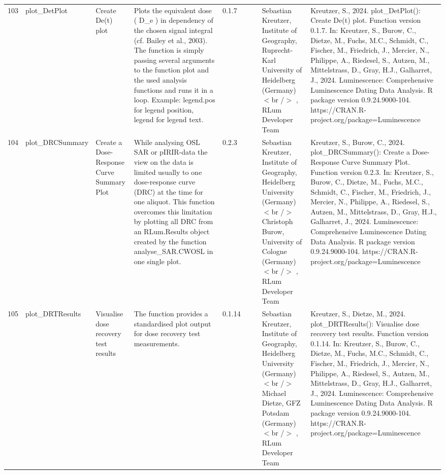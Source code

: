 \begin{table}[ht]
\begin{tabular}{rllllllll}
 \\ 
  103 & plot\_DetPlot & Create De(t) plot & Plots the equivalent dose ( D\_e ) in dependency of the chosen signal integral (cf. Bailey et al., 2003). The function is simply passing several arguments to the function  plot  and the used analysis functions and runs it in a loop. Example:  legend.pos  for legend position,  legend  for legend text. & 0.1.7
 &  &  & Sebastian Kreutzer, Institute of Geography, Ruprecht-Karl University of Heidelberg (Germany)$<$br /$>$ , RLum Developer Team & Kreutzer, S., 2024. plot\_DetPlot(): Create De(t) plot. Function version 0.1.7. In: Kreutzer, S., Burow, C., Dietze, M., Fuchs, M.C., Schmidt, C., Fischer, M., Friedrich, J., Mercier, N., Philippe, A., Riedesel, S., Autzen, M., Mittelstrass, D., Gray, H.J., Galharret, J., 2024. Luminescence: Comprehensive Luminescence Dating Data Analysis. R package version 0.9.24.9000-104. https://CRAN.R-project.org/package=Luminescence
 \\ 
  104 & plot\_DRCSummary & Create a Dose-Response Curve Summary Plot & While analysing OSL SAR or pIRIR-data the view on the data is limited usually to one dose-response curve (DRC) at the time for one aliquot. This function overcomes this limitation by plotting all DRC from an  RLum.Results  object created by the function  analyse\_SAR.CWOSL  in one single plot. & 0.2.3
 &  &  & Sebastian Kreutzer, Institute of Geography, Heidelberg University (Germany)  $<$br /$>$ Christoph Burow, University of Cologne (Germany)$<$br /$>$ , RLum Developer Team & Kreutzer, S., Burow, C., 2024. plot\_DRCSummary(): Create a Dose-Response Curve Summary Plot. Function version 0.2.3. In: Kreutzer, S., Burow, C., Dietze, M., Fuchs, M.C., Schmidt, C., Fischer, M., Friedrich, J., Mercier, N., Philippe, A., Riedesel, S., Autzen, M., Mittelstrass, D., Gray, H.J., Galharret, J., 2024. Luminescence: Comprehensive Luminescence Dating Data Analysis. R package version 0.9.24.9000-104. https://CRAN.R-project.org/package=Luminescence
 \\ 
  105 & plot\_DRTResults & Visualise dose recovery test results & The function provides a standardised plot output for dose recovery test measurements. & 0.1.14
 &  &  & Sebastian Kreutzer, Institute of Geography, Heidelberg University (Germany) $<$br /$>$ Michael Dietze, GFZ Potsdam (Germany)$<$br /$>$ , RLum Developer Team & Kreutzer, S., Dietze, M., 2024. plot\_DRTResults(): Visualise dose recovery test results. Function version 0.1.14. In: Kreutzer, S., Burow, C., Dietze, M., Fuchs, M.C., Schmidt, C., Fischer, M., Friedrich, J., Mercier, N., Philippe, A., Riedesel, S., Autzen, M., Mittelstrass, D., Gray, H.J., Galharret, J., 2024. Luminescence: Comprehensive Luminescence Dating Data Analysis. R package version 0.9.24.9000-104. https://CRAN.R-project.org/package=Luminescence

\end{tabular}
\end{table}
